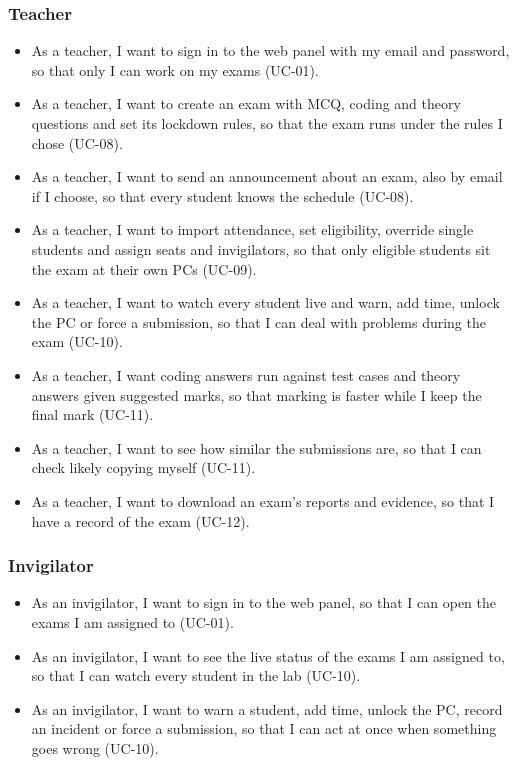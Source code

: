 \subsubsection{Teacher}
\begin{itemize}[nosep]
    \item As a teacher, I want to sign in to the web panel with my email and password, so that only I can work on my exams (UC-01).
    \item As a teacher, I want to create an exam with MCQ, coding and theory questions and set its lockdown rules, so that the exam runs under the rules I chose (UC-08).
    \item As a teacher, I want to send an announcement about an exam, also by email if I choose, so that every student knows the schedule (UC-08).
    \item As a teacher, I want to import attendance, set eligibility, override single students and assign seats and invigilators, so that only eligible students sit the exam at their own PCs (UC-09).
    \item As a teacher, I want to watch every student live and warn, add time, unlock the PC or force a submission, so that I can deal with problems during the exam (UC-10).
    \item As a teacher, I want coding answers run against test cases and theory answers given suggested marks, so that marking is faster while I keep the final mark (UC-11).
    \item As a teacher, I want to see how similar the submissions are, so that I can check likely copying myself (UC-11).
    \item As a teacher, I want to download an exam's reports and evidence, so that I have a record of the exam (UC-12).
\end{itemize}

\subsubsection{Invigilator}
\begin{itemize}[nosep]
    \item As an invigilator, I want to sign in to the web panel, so that I can open the exams I am assigned to (UC-01).
    \item As an invigilator, I want to see the live status of the exams I am assigned to, so that I can watch every student in the lab (UC-10).
    \item As an invigilator, I want to warn a student, add time, unlock the PC, record an incident or force a submission, so that I can act at once when something goes wrong (UC-10).
\end{itemize}

